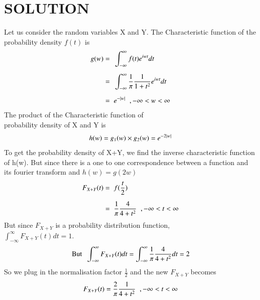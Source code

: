 \documentclass[journal,12pt,twocolumn]{IEEEtran}
\begin{document}
        \section*{SOLUTION}
        Let us consider the random variables X and Y.
        The Characteristic function of the probability density $f(t)$ is
        \begin{align}
            g(w) =\hspace{0.2cm} & \int_{-\infty}^{\infty}  f(t) {e}^{iwt} dt                                         \\[0.2cm]
            =\hspace{0.2cm}      & \int_{-\infty}^{\infty}  \displaystyle\frac{1}{\pi} \frac{1}{1+{t}^2} {e}^{iwt} dt \\[0.2cm]
            =\hspace{0.2cm}      & e^{-\vert w\vert}\hspace{0.2cm}, -\infty<w<\infty
        \end{align}
        The product of the Characteristic function of \\probability density of X and Y is
        \begin{align}
            h(w) = g_1(w) \times g_2(w) = {e}^{-2\vert w\vert}
        \end{align}
        To get the probability density of X+Y, we find the inverse characteristic function of h(w). But since there is a one to one correspondence between a function and its fourier transform and
        $h(w) = g(2w)$
        \begin{align}
            F_{X+Y}(t) =\hspace{0.2cm} & f(\frac{t}{2})                                   \\[0.2cm]
            =\hspace{0.2cm}            & \frac{1}{\pi} \frac{4}{4+{t}^2} \hspace{0.2cm},-\infty<t<\infty 
        \end{align}
        But since $F_{X+Y}$ is a probability distribution function,\\[0.2cm]$\displaystyle\int_{-\infty}^{\infty} F_{X+Y}(t) dt= 1$.
\begin{align}
    \text{But}\hspace{0.2cm} \int_{-\infty}^{\infty} F_{X+Y}(t) dt = \int_{-\infty}^{\infty} \frac{1}{\pi}\frac{4}{4+{t^2}} dt= 2
\end{align}
So we plug in the normalisation factor $\displaystyle\frac{1}{2}$ and the new $F_{X+Y}$ becomes
\begin{align}
    F_{X+Y}(t) = \frac{2}{\pi} \frac{1}{4+{t}^2}\hspace{0.2cm}, -\infty<t<\infty
\end{align}
\end{document}
